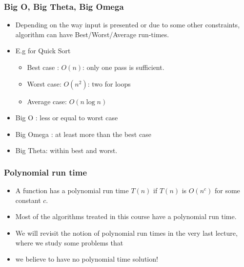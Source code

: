 \begin{frame}
	\frametitle{Big O, Big Theta, Big Omega}
	
		\begin{itemize}
			\item Depending on the way input is presented or due to some other constraints, algorithm can have Best/Worst/Average run-times.
			\item E.g for Quick Sort
					\begin{itemize}
					\item Best case : $O(n)$: only one pass is sufficient.
					\item Worst case: $O(n^2)$: two for loops
					\item Average case: $O(n\log n)$
					\end{itemize}	
			\item Big O : less or equal to worst case
			\item Big Omega :  at least more than the best case
			\item Big Theta: within best and worst.
	\end{itemize}	
\end{frame}



\begin{frame}
	\frametitle{Polynomial run time}
	
		\begin{itemize}
			\item A function has a polynomial run time $T(n)$ if $T(n)$ is $O(n^c)$ for some constant $c$.	
			\item Most of the algorithms treated in this course have a polynomial run time.
			\item We will revisit the notion of polynomial run times in the very last lecture, where we study some problems that
			\item we believe to have no polynomial time solution!
	\end{itemize}	
\end{frame}

